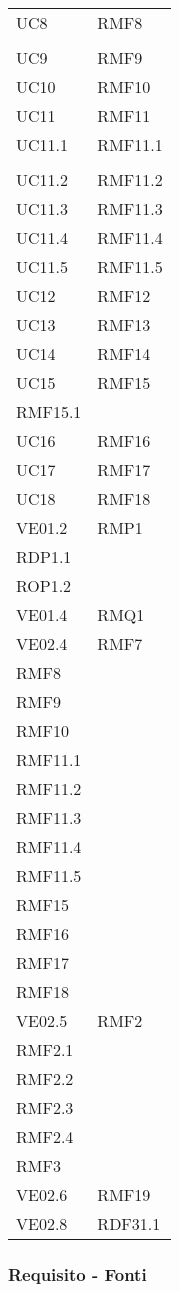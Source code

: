 \begin{longtable}[h!] { >{\centering}m{5cm} >{\centering}m{5cm} }
	 \tabularnewline
	 UC8 & RMF8 \\ 
	 \tabularnewline
	 UC9 & RMF9
	 \tabularnewline
	 UC10 & RMF10
	 \tabularnewline
	 UC11 & RMF11
	 \tabularnewline
	 UC11.1 & RMF11.1 \\ 
	 \tabularnewline
	 UC11.2 & RMF11.2
	 \tabularnewline
	 UC11.3 & RMF11.3
	 \tabularnewline
	 UC11.4 & RMF11.4
	 \tabularnewline
	 UC11.5 & RMF11.5
	 \tabularnewline
	 UC12 & RMF12
	 \tabularnewline
	 UC13 & RMF13
	 \tabularnewline
	 UC14 & RMF14
	 \tabularnewline
	 UC15 & RMF15 \\
	 RMF15.1
	 \tabularnewline
	 UC16 & RMF16
	 \tabularnewline
	 UC17 & RMF17
	 \tabularnewline
	 UC18 & RMF18
	 \tabularnewline
	 VE01.2 & RMP1 \\
	 RDP1.1 \\
	 ROP1.2 
	 \tabularnewline
	 VE01.4 & RMQ1
	 \tabularnewline
	 VE02.4 & RMF7\\
	 RMF8 \\
	 RMF9 \\
	 RMF10 \\
	 RMF11.1 \\
	 RMF11.2 \\
	 RMF11.3 \\
	 RMF11.4 \\
	 RMF11.5 \\
	 RMF15 \\
	 RMF16 \\
	 RMF17 \\
	 RMF18 
	 \tabularnewline
	 VE02.5 & RMF2 \\
	 RMF2.1 \\
	 RMF2.2 \\
	 RMF2.3 \\
	 RMF2.4 \\
	 RMF3
	 \tabularnewline
	 VE02.6 & RMF19
	 \tabularnewline
	 VE02.8 & RDF31.1
	 \tabularnewline
	
\end{longtable}

\newpage

\subsubsection{Requisito - Fonti}

